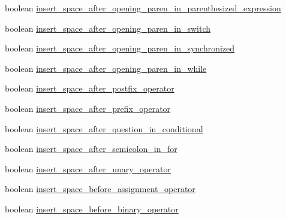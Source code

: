 \begin{DoxyCompactItemize}
\item 
boolean \hyperlink{classorg_1_1eclipse_1_1jdt_1_1ui_1_1tests_1_1refactoring_1_1infra_1_1TestFormatterOptions_a046d6258dd463b38c58e7ac60b922ec8}{insert\_\-space\_\-after\_\-opening\_\-paren\_\-in\_\-parenthesized\_\-expression}
\item 
boolean \hyperlink{classorg_1_1eclipse_1_1jdt_1_1ui_1_1tests_1_1refactoring_1_1infra_1_1TestFormatterOptions_a59320c6ef6318467e9f7ef73c8ce7fda}{insert\_\-space\_\-after\_\-opening\_\-paren\_\-in\_\-switch}
\item 
boolean \hyperlink{classorg_1_1eclipse_1_1jdt_1_1ui_1_1tests_1_1refactoring_1_1infra_1_1TestFormatterOptions_aeb6cc6d3a8661d5e2a309c6de4bcfce4}{insert\_\-space\_\-after\_\-opening\_\-paren\_\-in\_\-synchronized}
\item 
boolean \hyperlink{classorg_1_1eclipse_1_1jdt_1_1ui_1_1tests_1_1refactoring_1_1infra_1_1TestFormatterOptions_a1789396ec414a3fc5f08f55df23151b9}{insert\_\-space\_\-after\_\-opening\_\-paren\_\-in\_\-while}
\item 
boolean \hyperlink{classorg_1_1eclipse_1_1jdt_1_1ui_1_1tests_1_1refactoring_1_1infra_1_1TestFormatterOptions_ad2c06d742bbc19c29a74998adfbf82b0}{insert\_\-space\_\-after\_\-postfix\_\-operator}
\item 
boolean \hyperlink{classorg_1_1eclipse_1_1jdt_1_1ui_1_1tests_1_1refactoring_1_1infra_1_1TestFormatterOptions_a7ae9416bb72230be93c93a9ea6dd6146}{insert\_\-space\_\-after\_\-prefix\_\-operator}
\item 
boolean \hyperlink{classorg_1_1eclipse_1_1jdt_1_1ui_1_1tests_1_1refactoring_1_1infra_1_1TestFormatterOptions_a2ce7f9f97eddaf9c236dd445266727d1}{insert\_\-space\_\-after\_\-question\_\-in\_\-conditional}
\item 
boolean \hyperlink{classorg_1_1eclipse_1_1jdt_1_1ui_1_1tests_1_1refactoring_1_1infra_1_1TestFormatterOptions_a676affb8d336309dcdc84d8c4ef37b58}{insert\_\-space\_\-after\_\-semicolon\_\-in\_\-for}
\item 
boolean \hyperlink{classorg_1_1eclipse_1_1jdt_1_1ui_1_1tests_1_1refactoring_1_1infra_1_1TestFormatterOptions_af88479302cccce35bb9d73a0c79cfac1}{insert\_\-space\_\-after\_\-unary\_\-operator}
\item 
boolean \hyperlink{classorg_1_1eclipse_1_1jdt_1_1ui_1_1tests_1_1refactoring_1_1infra_1_1TestFormatterOptions_a36b00d1d1f5be9c100a92a2a20f0847d}{insert\_\-space\_\-before\_\-assignment\_\-operator}
\item 
boolean \hyperlink{classorg_1_1eclipse_1_1jdt_1_1ui_1_1tests_1_1refactoring_1_1infra_1_1TestFormatterOptions_a96748cbb569b226cf726681080649a24}{insert\_\-space\_\-before\_\-binary\_\-operator}

\end{DoxyCompactItemize}
